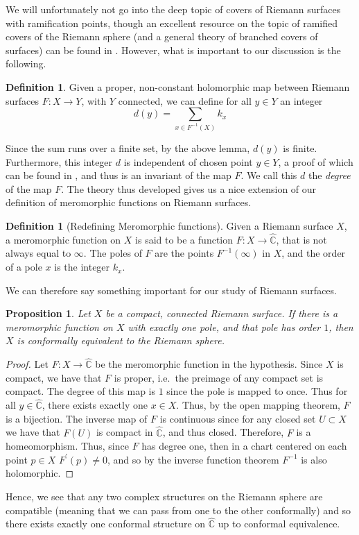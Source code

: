 \documentclass[11pt]{report}
\newtheorem{prop}[thm]{Proposition}
\theoremstyle{definition}
\newtheorem{defn}[thm]{Definition}
\begin{document}
We will unfortunately not go into the deep topic of covers of Riemann surfaces with ramification points, though an excellent resource on the topic of ramified covers of the Riemann sphere (and a general theory of branched covers of surfaces) can be found in \cite{algebra}. However, what is important to our discussion is the following.
\begin{defn}
  Given a proper, non-constant holomorphic map between Riemann surfaces $F:X \rightarrow Y$, with $Y$ connected, we can define for all $y\in Y$ an integer \[ d(y) = \sum\limits_{x \in F^{-1}(X)}k_x \]
\end{defn}
Since the sum runs over a finite set, by the above lemma, $d(y)$ is finite. Furthermore, this integer $d$ is independent of chosen point $y \in Y$, a proof of which can be found in \cite[Proposition 7]{donaldson}, and thus is an invariant of the map $F$. We call this $d$ the \emph{degree} of the map $F$. The theory thus developed gives us a nice extension of our definition of meromorphic functions on Riemann surfaces.
\begin{defn}[Redefining Meromorphic functions]
  Given a Riemann surface $X$, a meromorphic function on $X$ is said to be a function $F:X\rightarrow \widehat{\mathbb{C}}$, that is not always equal to $\infty$. The poles of $F$ are the points $F^{-1}(\infty)$ in $X$, and the order of a pole $x$ is the integer $k_x$. 
\end{defn}
We can therefore say something important for our study of Riemann surfaces.
\begin{prop}\label{PolesOnASphere}
  Let $X$ be a compact, connected Riemann surface. If there is a meromorphic function on $X$ with exactly one pole, and that pole has order $1$, then $X$ is conformally equivalent to the Riemann sphere.
\end{prop}
\begin{proof}
  Let $F:X \rightarrow \widehat{\mathbb{C}}$ be the meromorphic function in the hypothesis. Since $X$ is compact, we have that $F$ is proper, i.e.\ the preimage of any compact set is compact. The degree of this map is $1$ since the pole is mapped to once. Thus for all $y \in \widehat{\mathbb{C}}$, there exists exactly one $x \in X$. Thus, by the open mapping theorem, $F$ is a bijection. The inverse map of $F$ is continuous since for any closed set $U \subset X$ we have that $F(U)$ is compact in $\widehat{\mathbb{C}}$, and thus closed. Therefore, $F$ is a homeomorphism. Thus, since $F$ has degree one, then in a chart centered on each point $p \in X$ $F^{\prime}(p)\neq 0$, and so by the inverse function theorem $F^{-1}$ is also holomorphic. 
\end{proof}
Hence, we see that any two complex structures on the Riemann sphere are compatible (meaning that we can pass from one to the other conformally) and so there exists exactly one conformal structure on $\widehat{\mathbb{C}}$ up to conformal equivalence.
\end{document}
